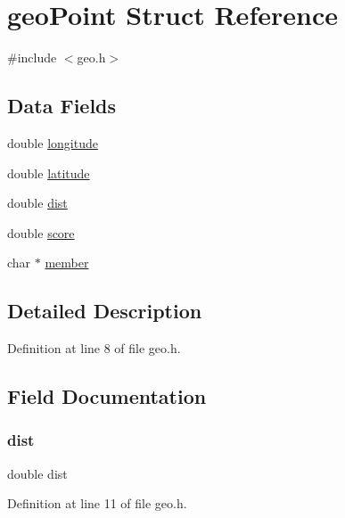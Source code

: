 \hypertarget{structgeo_point}{}\section{geo\+Point Struct Reference}
\label{structgeo_point}


{\ttfamily \#include $<$geo.\+h$>$}

\subsection*{Data Fields}
\begin{DoxyCompactItemize}
\item 
double \hyperlink{structgeo_point_ac155e35fdeebafc89723a51520fb9fe6}{longitude}
\item 
double \hyperlink{structgeo_point_a76714bdbc5c536fa77dfb14533ff82a9}{latitude}
\item 
double \hyperlink{structgeo_point_accf93555161c9eedf006462a228af523}{dist}
\item 
double \hyperlink{structgeo_point_a40a24ec85daa9ac70aa74e4ca744f838}{score}
\item 
char $\ast$ \hyperlink{structgeo_point_a2dc40cdaee6928fd3dba8fde8f4eed21}{member}
\end{DoxyCompactItemize}


\subsection{Detailed Description}


Definition at line 8 of file geo.\+h.



\subsection{Field Documentation}
\mbox{\label{structgeo_point_accf93555161c9eedf006462a228af523}} 
\subsubsection{\texorpdfstring{dist}{dist}}
{\footnotesize\ttfamily double dist}



Definition at line 11 of file geo.\+h.

\mbox{\label{structgeo_point_a76714bdbc5c536fa77dfb14533ff82a9}} 
